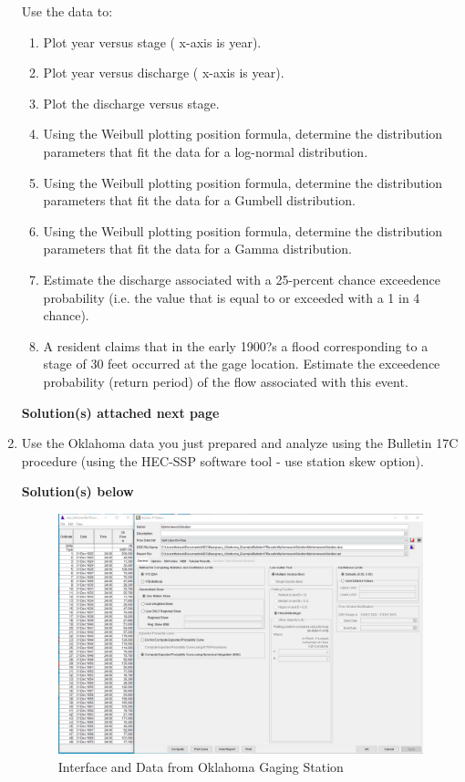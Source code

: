 \documentclass[12pt]{article}
\begin{document}
\begin{enumerate}
Use the data to:
\begin{enumerate}
\item Plot year versus stage ( x-axis is year).
\item Plot year versus discharge ( x-axis is year).
\item Plot the discharge versus stage.
\item Using the Weibull plotting position formula, determine the distribution parameters that fit the data for a log-normal distribution.
\item Using the Weibull plotting position formula, determine the distribution parameters that fit the data for a Gumbell distribution.
\item Using the Weibull plotting position formula, determine the distribution parameters that fit the data for a Gamma distribution.
\item Estimate the discharge associated with a 25-percent chance exceedence probability (i.e. the value that is equal to or exceeded with a 1 in 4 chance).
\item A resident claims that in the early 1900?s a flood corresponding to a stage of 30 feet occurred at the gage location.  Estimate the exceedence probability (return period) of the flow associated with this event.
\end{enumerate}
\clearpage
\textbf{Solution(s) attached next page}




\item Use the Oklahoma data you just prepared and analyze using the Bulletin 17C procedure (using the HEC-SSP software tool - use station skew option).

\textbf{Solution(s) below}
\begin{figure}[h!] %
   \centering
   \includegraphics[width=7in]{HEC-SSP-interface.png} 
   \caption{Interface and Data from Oklahoma Gaging Station}
   \label{fig:HEC-SSP-interface}
\end{figure}


\end{enumerate}
\end{document}
